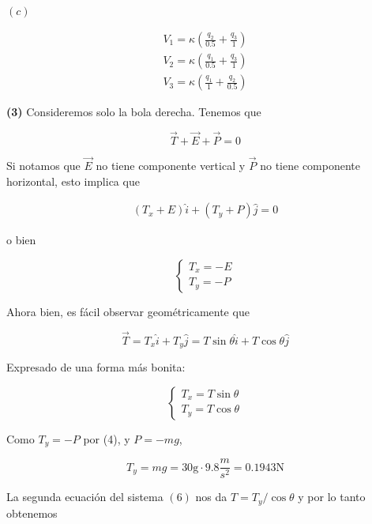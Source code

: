 \documentclass[12pt]{article}
\theoremstyle{definition}
\begin{document}
$(c)$ 

\begin{align*}
    V_1 = \kappa \left( \frac{q_2}{0.5} + \frac{q_3}{1} \right)  \\ 
    V_2 = \kappa \left( \frac{q_1}{0.5} + \frac{q_3}{1} \right)  \\ 
    V_3 = \kappa \left( \frac{q_1}{1} + \frac{q_2}{0.5} \right)  
\end{align*}

\pagebreak 

\textbf{(3)} Consideremos solo la bola derecha. Tenemos que 

\begin{equation*}
    \vec{T} + \vec{E} + \vec{P} = 0
\end{equation*}

Si notamos que $\vec{E}$ no tiene componente vertical y $\vec{P}$ no tiene
componente horizontal, esto implica que

\begin{align*}
    (T_x + E)\hat{i} + (T_y + P) \hat{j} = 0
\end{align*}

o bien 

\begin{equation}
    \begin{cases}
        T_x = -E \\ 
        T_y = -P
    \end{cases}
\end{equation}

Ahora bien, es fácil observar geométricamente que 

\begin{equation}
    \vec{T} = T_x \hat{i} + T_y \hat{j} = T \sin \theta \hat{i} + T \cos \theta
    \hat{j}
\end{equation}

Expresado de una forma más bonita:

\begin{equation}
    \begin{cases}
        T_x = T \sin \theta \\ 
        T_y = T \cos \theta
    \end{cases}
\end{equation}

Como $T_y = -P$ por (4), y $P = -mg$,

$$T_y = mg = 30\text{g} \cdot 9.8 \frac{m}{s^2} = 0.1943 \text{N}$$

La segunda ecuación del sistema $(6)$ nos da $T = T_y /\cos \theta$ y por lo
tanto obtenemos 
\end{document}
